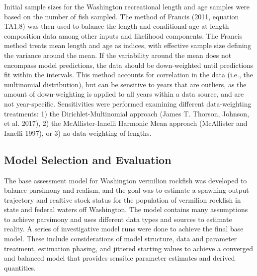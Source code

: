 \documentclass[11pt,
  english,
  a4paper,
]{article}
\begin{document}
Initial sample sizes for the Washington recreational length and age samples were based on the number of fish sampled. The method of Francis {(2011, equation TA1.8)\leavevmode\tagmcend\tagstructend} was then used to balance the length and conditional age-at-length composition data among other inputs and likelihood components. The Francis method treats mean length and age as indices, with effective sample size defining the variance around the mean. If the variability around the mean does not encompass model predictions, the data should be down-weighted until predictions fit within the intervals. This method accounts for correlation in the data (i.e., the multinomial distribution), but can be sensitive to years that are outliers, as the amount of down-weighting is applied to all years within a data source, and are not year-specific. Sensitivities were performed examining different data-weighting treatments: 1) the Dirichlet-Multinomial approach {(James T. Thorson, Johnson, et al. 2017)\leavevmode\tagmcend\tagstructend}, 2) the McAllister-Ianelli Harmonic Mean approach {(McAllister and Ianelli 1997)\leavevmode\tagmcend\tagstructend}, or 3) no data-weighting of lengths.

\leavevmode\tagmcend\tagstructend\par


\hypertarget{model-selection-and-evaluation}{%
\subsection{Model Selection and Evaluation}\label{model-selection-and-evaluation}}

\leavevmode\tagmcend\tagstructend


The base assessment model for Washington vermilion rockfish was developed to balance parsimony and realism, and the goal was to estimate a spawning output trajectory and realtive stock status for the population of vermilion rockfish in state and federal waters off Washington. The model contains many assumptions to achieve parsimony and uses different data types and sources to estimate reality. A series of investigative model runs were done to achieve the final base model. These include considerations of model structure, data and parameter treatment, estimation phasing, and jittered starting values to achieve a converged and balanced model that provides sensible parameter estimates and derived quantities.
\end{document}
